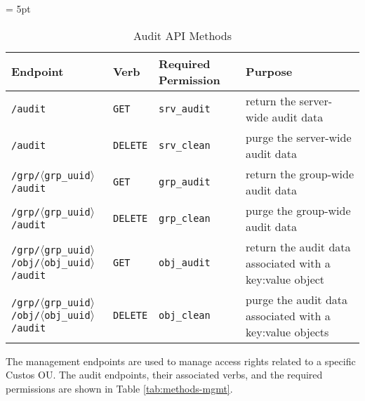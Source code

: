 \begin{table}[!tbh]
  \vspace{1ex}
  \begin{center}
    \tabulinesep = 5pt
    \begin{tabu} to \textwidth
      { | X[2.5,l,m]
        | X[.5,l,m]
        | X[1,l,m]
        | X[1,l,m]
        | }
      \hline
      \textbf{Endpoint}
      & \textbf{Verb}
      & \textbf{Required Permission}
      & \textbf{Purpose}
      \\ \hline
      \texttt{/audit}
      & \texttt{GET} & \texttt{srv\_audit}
      & return the server-wide audit data
      \\ \hline
      \texttt{/audit}
      & \texttt{DELETE} & \texttt{srv\_clean}
      & purge the server-wide audit data
      \\ \hline
      \texttt{/grp/$\langle$grp\_uuid$\rangle$/audit}
      & \texttt{GET} & \texttt{grp\_audit}
      & return the group-wide audit data
      \\ \hline
      \texttt{/grp/$\langle$grp\_uuid$\rangle$/audit}
      & \texttt{DELETE} & \texttt{grp\_clean}
      & purge the group-wide audit data
      \\ \hline
      \texttt{/grp/$\langle$grp\_uuid$\rangle$/obj/$\langle$obj\_uuid$\rangle$/audit}
      & \texttt{GET} & \texttt{obj\_audit}
      & return the audit data associated with a key:value object
      \\ \hline
      \texttt{/grp/$\langle$grp\_uuid$\rangle$/obj/$\langle$obj\_uuid$\rangle$/audit}
      & \texttt{DELETE} & \texttt{obj\_clean}
      & purge the audit data associated with a key:value objects
      \\ \hline
    \end{tabu}
  \end{center}
  \caption{Audit API Methods}
  \label{tab:methods-audit}
\end{table}

The management endpoints are used to manage access rights related to a
specific Custos OU. The audit endpoints, their associated verbs, and
the required permissions are shown in Table \ref{tab:methods-mgmt}.


